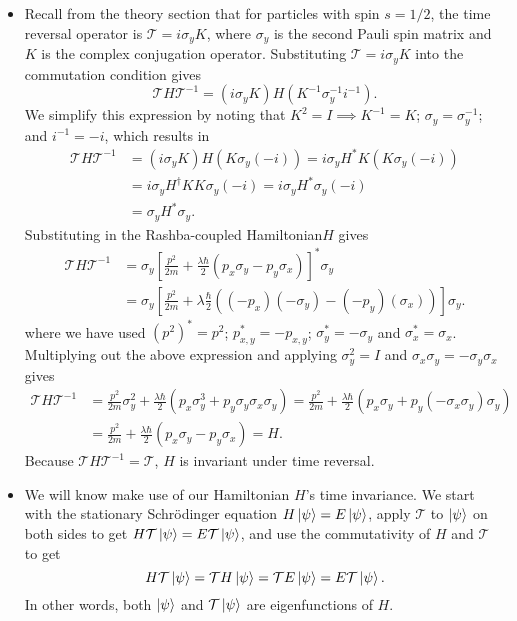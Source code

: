 \documentclass[11pt, a4paper]{article}
\newcommand{\Schro}{Schr\"{o}dinger\xspace}
\newcommand{\Ham}{Hamiltonian\xspace}
\newcommand{\T}{\mathcal{T}}  %
\begin{document}
\begin{itemize}
	\item Recall from the theory section that for particles with spin $ s = 1/2 $, the time reversal operator is $ \T = i \sigma_{y} K $, where $ \sigma_{y} $ is the second Pauli spin matrix and $ K $ is the complex conjugation operator. Substituting $ \T = i \sigma_{y} K $ into the commutation condition gives
	\begin{equation*}
		\T H \T^{-1} = (i\sigma_{y}K)H(K^{-1}\sigma_{y}^{-1}i^{-1}).
	\end{equation*}
	We simplify this expression by noting that $ K^{2} = I \implies K^{-1} = K$;  $ \sigma_{y} = \sigma_{y}^{-1} $; and $ i^{-1} = -i $, which results in
	\begin{align*}
		\T H \T^{-1} &= (i\sigma_{y}K)H(K\sigma_{y}(-i)) = i \sigma_{y} H^{*} K (K\sigma_{y}(-i)) \\
		&= i \sigma_{y} H^{\dagger} KK \sigma_{y}(-i) = i \sigma_{y}H^{*}\sigma_{y}(-i) \\
		&= \sigma_{y}H^{*} \sigma_{y}.
	\end{align*} 
	Substituting in the Rashba-coupled \Ham $ H $ gives
	\begin{align*}
		\T H\T^{-1} &= \sigma_{y} \left[\frac{p^{2}}{2m} + \frac{\lambda\hbar}{2} (p_{x}\sigma_{y} - p_{y}\sigma_{x})\right]^{*}\sigma_{y} \\
		& = \sigma_{y}\left[\frac{p^{2}}{2m} + \lambda \frac{\hbar}{2}\left((-p_{x})(-\sigma_{y}) - (-p_{y})(\sigma_{x}) \right)\right]\sigma_{y}.
	\end{align*}
	where we have used $ (p^{2})^{*} = p^{2} $; $ p_{x,y}^{*} = -p_{x,y} $; $ \sigma_{y}^{*} = -\sigma_{y} $ and $ \sigma_{x}^{*} = \sigma_{x} $. Multiplying out the above expression and applying $ \sigma_{y}^{2} = I $ and $ \sigma_{x}\sigma_{y} = -\sigma_{y}\sigma_{x} $ gives
	\begin{align*}
		\T H\T^{-1} & = \frac{p^{2}}{2m}\sigma_{y}^{2} + \frac{\lambda\hbar}{2}\left(p_{x}\sigma_{y}^{3} + p_{y}\sigma_{y}\sigma_{x}\sigma_{y}\right) = \frac{p^{2}}{2m} + \frac{\lambda\hbar}{2}\left(p_{x}\sigma_{y} + p_{y}(-\sigma_{x}\sigma_{y})\sigma_{y}\right)\\
		&= \frac{p^{2}}{2m} + \frac{\lambda\hbar}{2} \left(p_{x}\sigma_{y} - p_{y}\sigma_{x}\right) = H.
	\end{align*}
	Because $ \T H\T^{-1} = \T$, $ H $ is invariant under time reversal.
	
	\item We will know make use of our Hamiltonian $ H $'s time invariance. We start with the stationary \Schro equation $ H \ket{\psi} = E \ket{\psi} $, apply $ \T $ to $ \ket{\psi} $ on both sides to get  $ H \T\ket{\psi} = E \T\ket{\psi} $, and use the commutativity of $ H $ and $ \T $ to get
	\begin{equation*}
		H \T \ket{\psi} = \T H \ket{\psi} = \T E \ket{\psi} = E \T \ket{\psi}.
	\end{equation*}
	In other words, both $ \ket{\psi} $ and $ \T\ket{\psi} $ are eigenfunctions of $ H $. 
	

\end{itemize}
\end{document}

